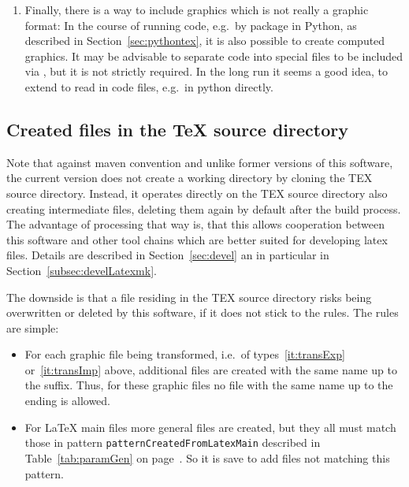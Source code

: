\begin{enumerate}
those graphics files induce additional files 
by running \LaTeX.
Essentially, each of the abovementioned type of format
can be included that way but currently,
this is done for the \gls{svg}-format only
included by the package  (see~\cite{SvgP}).
The author personally refrains from using packages like that
because of the lack of flexibility and further drawbacks. 
\item 
Finally, there is a way to include graphics which is not really a graphic format: 
In the course of running code, e.g.~by package  in Python, 
as described in Section~\ref{sec:pythontex}, 
it is also possible to create computed graphics. 
It may be advisable to separate code into special files to be included via , 
but it is not strictly required. 
In the long run it seems a good idea, to extend  
to read in code files, e.g.~in python directly. 
\end{enumerate}




\subsection{Created files in the \TeX{} source directory}\label{subsec:sourceCreated}

Note that against maven convention and unlike former versions of this software, 
the current version does not create a working directory 
by cloning the TEX source directory. 
Instead, it operates directly on the TEX source directory 
also creating intermediate files, 
deleting them again by default after the build process.
The advantage of processing that way is,
that this allows cooperation between this software
and other tool chains which are better suited for developing latex files.
Details are described in Section~\ref{sec:devel} an in particular in Section~\ref{subsec:develLatexmk}.

The downside is that a file residing in the TEX source directory 
risks being overwritten or deleted by this software, 
if it does not stick to the rules. 
The rules are simple: 
%
\begin{itemize}
\item
For each graphic file being transformed, 
i.e.~of types~\ref{it:transExp} or~\ref{it:transImp} above, 
additional files are created with the same name up to the suffix. 
Thus, for these graphic files no file with the same name 
up to the ending is allowed. 
\item
For \LaTeX{} main files more general files are created, 
but they all must match those in pattern \texttt{patternCreatedFromLatexMain} 
described in Table~\ref{tab:paramGen} on page~\pageref{tab:paramGen}. 
So it is save to add files not matching this pattern. 
\end{itemize}


